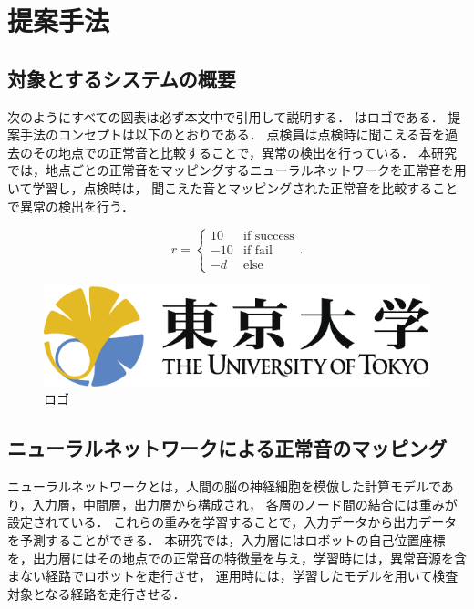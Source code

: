 \documentclass[../main]{subfiles}
\begin{document}
\graphicspath{{../figures/}}

\section{提案手法}
\subsection{対象とするシステムの概要}
次のようにすべての図表は必ず本文中で引用して説明する．
はロゴである．
提案手法のコンセプトは以下のとおりである．
点検員は点検時に聞こえる音を過去のその地点での正常音と比較することで，異常の検出を行っている．
本研究では，地点ごとの正常音をマッピングするニューラルネットワークを正常音を用いて学習し，点検時は，
聞こえた音とマッピングされた正常音を比較することで異常の検出を行う．



\begin{equation}
  r = \left\{
    \begin{array}{cc}
      10   & \text{if success} \\
      - 10 & \text{if fail}    \\
      - d  & \text{else}
    \end{array}
  \right. \text{.}
\end{equation}

\begin{figure}[tb]
  \centering
  \includegraphics[keepaspectratio, width=0.8\linewidth]{utlogo.pdf}
  \caption{ロゴ}
\end{figure}

\subsection{ニューラルネットワークによる正常音のマッピング}
ニューラルネットワークとは，人間の脳の神経細胞を模倣した計算モデルであり，入力層，中間層，出力層から構成され，
各層のノード間の結合には重みが設定されている．
これらの重みを学習することで，入力データから出力データを予測することができる．
本研究では，入力層にはロボットの自己位置座標を，出力層にはその地点での正常音の特徴量を与え，学習時には，異常音源を含まない経路でロボットを走行させ，
運用時には，学習したモデルを用いて検査対象となる経路を走行させる．
\end{document}
